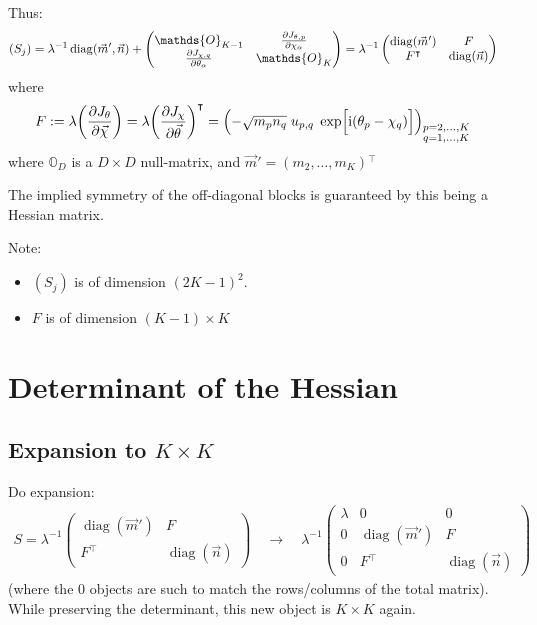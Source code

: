 \documentclass[
	english,
	a4paper,
	fontsize=10pt,
	parskip=half,
	titlepage=true,
	DIV=12,
	final
]{scrreprt}
\newcommand*{\thus}{\ensuremath{\rightarrow}\xspace}
\newcommand*{\transp}{\ensuremath{^\intercal}}
\newcommand*{\iunit}{\ensuremath{\mathrm{i}}}
\DeclareMathOperator{\diag}{diag}
\begin{document}
Thus:
\begin{align}
	(S_j)
&=
	\lambda^{-1}
	\diag(\vec{m}', \vec{n})
	+
	\begin{pmatrix}
		\mathds{O}_{K-1} & 
		\pdv{J_{\theta, p}}{\chi_{\alpha}}
		\\
		\pdv{J_{\chi, q}}{\theta_{\alpha}} &
		\mathds{O}_{K}
	\end{pmatrix}
=
	\lambda^{-1}
	\begin{pmatrix}
		\diag(\vec{m}') & F 			\\
		F\transp & \diag(\vec{n})
	\end{pmatrix}
\end{align}
where
\begin{align}
	F
&:=
	\lambda \qty( \pdv{J_{\theta}}{\vec{\chi}} ) 
	= \lambda \qty( \pdv{J_{\chi}}{\vec{\theta}} )\transp
	= \qty( -\sqrt{m_p n_q} \; u_{p,q} \; \exp[\Big. \iunit(\theta_p - \chi_q)] )_{
		\substack{p = 2, \ldots, K \\ q = 1, \ldots, K}
	}	
\label{eqn:defDetOffDiagonalF}
\end{align}
where $\mathds{O}_{D}$ is a $D \times D$ null-matrix, and $\vec{m}' = (m_2, \ldots, m_K)\transp$

The implied symmetry of the off-diagonal blocks is guaranteed by this being a Hessian matrix.

Note:
\begin{itemize}
\item $(S_j)$ is of dimension $(2K-1)^{2}$.
\item $F$ is of dimension $(K - 1) \times K$
\end{itemize}


\section{Determinant of the Hessian}
\subsection{Expansion to $K \times K$}
Do expansion:
\begin{align}
	S
=
	\lambda^{-1}
	\begin{pmatrix}
		\diag(\vec{m}') & F 			\\
		F\transp & \diag(\vec{n})
	\end{pmatrix}
\quad\thus\quad
	\lambda^{-1}
	\begin{pmatrix}
		\lambda		& 0					& 0			\\
		0			& \diag(\vec{m}')	& F			\\
		0			& F\transp			& \diag(\vec{n})
	\end{pmatrix}
\end{align}
(where the $0$ objects are such to match the rows/columns of the total matrix). While preserving the determinant, this new object is $K \times K$ again.
\end{document}
